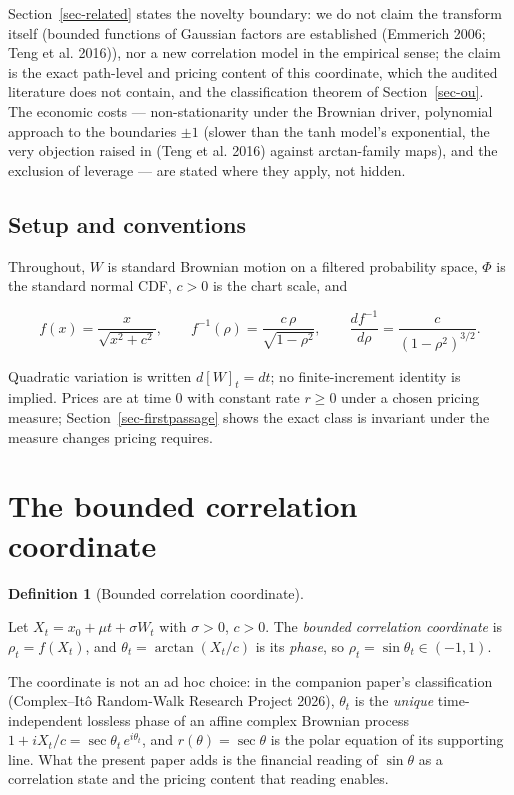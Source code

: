 \documentclass[
  english,
  10pt,
  letterpaper,
  DIV=11,
  numbers=noendperiod]{scrartcl}
\theoremstyle{plain}
\theoremstyle{plain}
\theoremstyle{plain}
\theoremstyle{plain}
\theoremstyle{definition}
\newtheorem{definition}{Definition}[section]
\theoremstyle{remark}
\begin{document}
Section~\ref{sec-related} states the novelty boundary: we do not claim
the transform itself (bounded functions of Gaussian factors are
established (Emmerich 2006; Teng et al. 2016)), nor a new correlation
model in the empirical sense; the claim is the exact path-level and
pricing content of this coordinate, which the audited literature does
not contain, and the classification theorem of Section~\ref{sec-ou}. The
economic costs --- non-stationarity under the Brownian driver,
polynomial approach to the boundaries \(\pm1\) (slower than the tanh
model's exponential, the very objection raised in (Teng et al. 2016)
against arctan-family maps), and the exclusion of leverage --- are
stated where they apply, not hidden.

\subsection{Setup and conventions}\label{setup-and-conventions}

Throughout, \(W\) is standard Brownian motion on a filtered probability
space, \(\Phi\) is the standard normal CDF, \(c>0\) is the chart scale,
and

\[
f(x)=\frac{x}{\sqrt{x^{2}+c^{2}}},\qquad
f^{-1}(\rho)=\frac{c\,\rho}{\sqrt{1-\rho^{2}}},\qquad
\frac{d f^{-1}}{d\rho}=\frac{c}{(1-\rho^{2})^{3/2}} .
\]

Quadratic variation is written \(d[W]_t=dt\); no finite-increment
identity is implied. Prices are at time \(0\) with constant rate
\(r\ge0\) under a chosen pricing measure; Section~\ref{sec-firstpassage}
shows the exact class is invariant under the measure changes pricing
requires.

\section{The bounded correlation coordinate}\label{sec-coordinate}

\begin{definition}[Bounded correlation
coordinate]\protect\hypertarget{def-coordinate}{}\label{def-coordinate}

Let \(X_t=x_0+\mu t+\sigma W_t\) with \(\sigma>0\), \(c>0\). The
\emph{bounded correlation coordinate} is \(\rho_t=f(X_t)\), and
\(\theta_t=\arctan(X_t/c)\) is its \emph{phase}, so
\(\rho_t=\sin\theta_t\in(-1,1)\).

\end{definition}

The coordinate is not an ad hoc choice: in the companion paper's
classification (Complex--Itô Random-Walk Research Project 2026),
\(\theta_t\) is the \emph{unique} time-independent lossless phase of an
affine complex Brownian process
\(1+iX_t/c=\sec\theta_t\,e^{i\theta_t}\), and \(r(\theta)=\sec\theta\)
is the polar equation of its supporting line. What the present paper
adds is the financial reading of \(\sin\theta\) as a correlation state
and the pricing content that reading enables.
\end{document}

